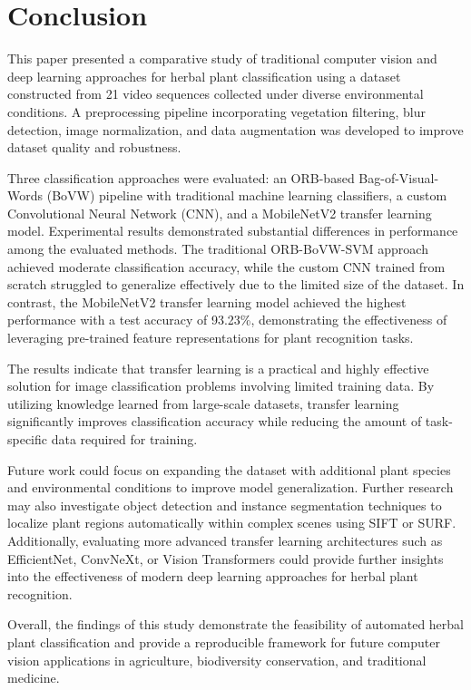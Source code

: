 \section{Conclusion}

This paper presented a comparative study of traditional computer vision and deep learning approaches for herbal plant classification using a dataset constructed from 21 video sequences collected under diverse environmental conditions. A preprocessing pipeline incorporating vegetation filtering, blur detection, image normalization, and data augmentation was developed to improve dataset quality and robustness.

Three classification approaches were evaluated: an ORB-based Bag-of-Visual-Words (BoVW) pipeline with traditional machine learning classifiers, a custom Convolutional Neural Network (CNN), and a MobileNetV2 transfer learning model. Experimental results demonstrated substantial differences in performance among the evaluated methods. The traditional ORB-BoVW-SVM approach achieved moderate classification accuracy, while the custom CNN trained from scratch struggled to generalize effectively due to the limited size of the dataset. In contrast, the MobileNetV2 transfer learning model achieved the highest performance with a test accuracy of 93.23\%, demonstrating the effectiveness of leveraging pre-trained feature representations for plant recognition tasks.

The results indicate that transfer learning is a practical and highly effective solution for image classification problems involving limited training data. By utilizing knowledge learned from large-scale datasets, transfer learning significantly improves classification accuracy while reducing the amount of task-specific data required for training.

Future work could focus on expanding the dataset with additional plant species and environmental conditions to improve model generalization. Further research may also investigate object detection and instance segmentation techniques to localize plant regions automatically within complex scenes using SIFT\cite{sift} or SURF\cite{surf}. Additionally, evaluating more advanced transfer learning architectures such as EfficientNet\cite{efficientnet}, ConvNeXt\cite{convnextv2}, or Vision Transformers could provide further insights into the effectiveness of modern deep learning approaches for herbal plant recognition.

Overall, the findings of this study demonstrate the feasibility of automated herbal plant classification and provide a reproducible framework for future computer vision applications in agriculture, biodiversity conservation, and traditional medicine.
